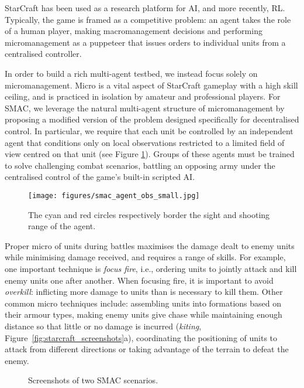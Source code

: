 \documentclass[twoside,11pt]{article}
\begin{document}
StarCraft has been used as a research platform for AI, and more recently, RL. Typically, the game is framed as a competitive problem: an agent takes the role of a human player, making macromanagement decisions and performing micromanagement as a puppeteer that issues orders to individual units from a centralised controller.

In order to build a rich multi-agent testbed, we instead focus solely on micromanagement.
Micro is a vital aspect of StarCraft gameplay with a high skill ceiling, and is practiced in isolation by amateur and professional players.
For SMAC, we leverage the natural multi-agent structure of micromanagement by proposing a modified version of the problem designed specifically for decentralised control.
In particular, we require that each unit be controlled by an independent agent that conditions only on local observations restricted to a limited field of view centred on that unit (see Figure \ref{fig:obs}).
Groups of these agents must be trained to solve challenging combat scenarios, battling an opposing army under the centralised control of the game's built-in scripted AI.

\begin{figure}[t!]
	\centering
	\texttt{[image: figures/smac\_agent\_obs\_small.jpg]}
	\caption{The cyan and red circles respectively border the sight and shooting range of the agent.}
	\label{fig:obs}
\end{figure}

Proper micro of units during battles maximises the damage dealt to enemy units while minimising damage received, and requires a range of skills.
For example, one important technique is \textit{focus fire}, i.e., ordering units to jointly attack and kill enemy units one after another. When focusing fire, it is important to avoid \textit{overkill}: inflicting more damage to units than is necessary to kill them.
Other common micro techniques include: assembling units into formations based on their armour types, making enemy units give chase while maintaining enough distance so that little or no damage is incurred (\textit{kiting},  Figure~\ref{fig:starcraft_screenshots}a), coordinating the positioning of units to attack from different directions or taking advantage of the terrain to defeat the enemy.

\begin{figure}[t!]
	\centering
	\caption{\label{fig:SC2maps_2}Screenshots of two SMAC scenarios.}
\end{figure}
\end{document}
